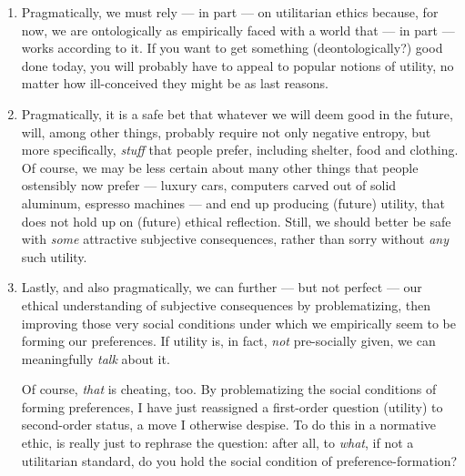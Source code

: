 \begin{enumerate}

	\item 
		Pragmatically, we must rely --- in part --- on utilitarian ethics because, for now, we are ontologically as empirically faced with a world that --- in part --- works according to it.
		If you want to get something (deontologically?) good done today, you will probably have to appeal to popular notions of utility, no matter how ill-conceived they might be as last reasons.

	\item
		Pragmatically, it is a safe bet that whatever we will deem good in the future, will, among other things, probably require not only negative entropy, but more specifically, \emph{stuff} that people prefer, including shelter, food and clothing. 
		Of course, we may be less certain about many other things that people ostensibly now prefer --- luxury cars, computers carved out of solid aluminum, espresso machines --- and end up producing (future) utility, that does not hold up on (future) ethical reflection.
		Still, we should better be safe with \emph{some} attractive subjective consequences, rather than sorry without \emph{any} such utility.

	\item
		Lastly, and also pragmatically, we can further --- but not perfect --- our ethical understanding of subjective consequences by problematizing, then improving those very social conditions under which we empirically seem to be forming our preferences. %
		If utility is, in fact, \emph{not} pre-socially given, we can meaningfully \emph{talk} about it.
		
		Of course, \emph{that} is cheating, too.
		By problematizing the social conditions of forming preferences, I have just reassigned a first-order question (utility) to second-order status, a move I otherwise despise.
		To do this in a normative ethic, is really just to rephrase the question: after all, to \emph{what}, if not a utilitarian standard, do you hold the social condition of preference-formation?
		

\end{enumerate}
